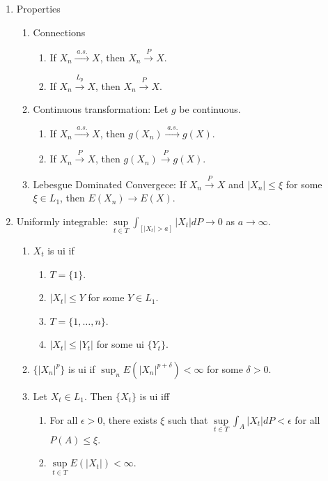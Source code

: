 \documentclass{article}
\newcommand{\as}{\;a.s.\;}
\newcommand{\pto}{\overset{P}{\to}}
\newcommand{\asto}{\overset{\as}{\to}}
\newcommand{\lpto}{\overset{L_p}{\to}}
\begin{document}
\begin{enumerate}
\begin{enumerate}
\begin{enumerate}
      \end{enumerate}
    \item Properties
      \begin{enumerate}
      \item Connections
        \begin{enumerate}
        \item If $X_n \asto X$, then $X_n \pto X$.
        \item If $X_n \lpto X$, then $X_n \pto X$.
        \end{enumerate}
      \item Continuous transformation: Let $g$ be continuous.
        \begin{enumerate}
        \item If $X_n \asto X$, then $g(X_n) \asto g(X)$.
        \item If $X_n \pto X$, then $g(X_n) \pto g(X)$.
        \end{enumerate}
      \item Lebesgue Dominated Convergece: If $X_n \pto X$ and $|X_n| \leq \xi$ for some $\xi \in L_1$, then $E(X_n) \to E(X)$.
      \end{enumerate}
    \item Uniformly integrable: $\underset{t \in T}{\sup} \int_{[|X_t| > a]} |X_t| dP \to 0$ as $a \to \infty$.
      \begin{enumerate}
      \item $X_t$ is ui if
        \begin{enumerate}
        \item $T = \{1\}$.
        \item $|X_t| \leq Y$ for some $Y \in L_1$.
        \item $T = \{1, \ldots, n\}$.
        \item $|X_t| \leq |Y_t|$ for some ui $\{Y_t\}$.
        \end{enumerate}
      \item $\{|X_n|^p\}$ is ui if $\sup_n E(|X_n|^{p+\delta}) < \infty$ for some $\delta > 0$.
      \item Let $X_t \in L_1$. Then $\{X_t\}$ is ui iff
        \begin{enumerate}
        \item For all $\epsilon >0$, there exists $\xi$ such that $\underset{t \in T}{\sup} \int_A |X_t| dP < \epsilon$ for all $P(A) \leq \xi$.
        \item $\underset{t \in T}{\sup} E(|X_t|) < \infty$.
        \end{enumerate}

\end{enumerate}
\end{enumerate}
\end{enumerate}
\end{document}

